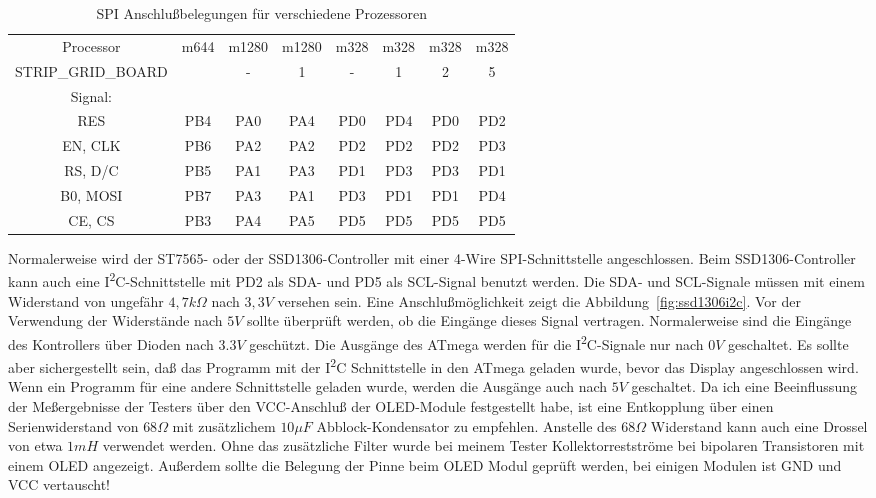 \begin{table}[H]
  \begin{center}
    \begin{tabular}{| c || c | c | c | c | c | c | c |}
    \hline
 Processor  & m644  & m1280 & m1280  & m328 & m328 & m328 & m328 \\
STRIP\_GRID\_BOARD &       &   -   &   1    &  -   &  1   &  2   &  5   \\
    \hline
    \hline
Signal:     &       &       &        &      &      &      &      \\
  RES       &  PB4  & PA0   &  PA4   & PD0  & PD4  & PD0  & PD2 \\
    \hline
  EN, CLK   &  PB6  & PA2   &  PA2   & PD2  & PD2  & PD2  & PD3 \\
    \hline
  RS, D/C   &  PB5  & PA1   &  PA3   & PD1  & PD3  & PD3  & PD1 \\
    \hline
  B0, MOSI  &  PB7  & PA3   &  PA1   & PD3  & PD1  & PD1  & PD4 \\
    \hline
  CE, CS    &  PB3  & PA4   &  PA5   & PD5  & PD5  & PD5  & PD5 \\
    \hline
    \end{tabular}
  \end{center}
  \caption{SPI Anschlußbelegungen für verschiedene Prozessoren}
\label{tab:spi-processor}
\end{table}

Normalerweise wird der ST7565- oder der SSD1306-Controller mit einer 4-Wire SPI-Schnittstelle angeschlossen.
Beim SSD1306-Controller kann auch eine I\textsuperscript{2}C-Schnittstelle mit PD2 als SDA- und PD5 als SCL-Signal benutzt werden.
Die SDA- und SCL-Signale müssen mit einem  Widerstand von ungefähr \(4,7k\Omega\) nach \(3,3V\) versehen sein.
Eine Anschlußmöglichkeit zeigt die Abbildung~\ref{fig:ssd1306i2c}.
Vor der Verwendung der  Widerstände nach \(5V\) sollte überprüft werden, ob die Eingänge dieses Signal vertragen.
Normalerweise sind die Eingänge des Kontrollers über Dioden nach \(3.3V\) geschützt.
Die Ausgänge des ATmega werden für die I\textsuperscript{2}C-Signale nur nach \(0V\) geschaltet.
Es sollte aber sichergestellt sein, daß das Programm mit der I\textsuperscript{2}C Schnittstelle in den ATmega geladen wurde,
bevor das Display angeschlossen wird. Wenn ein Programm für eine andere Schnittstelle geladen wurde,
werden die Ausgänge auch nach \(5V\) geschaltet.
Da ich eine Beeinflussung der Meßergebnisse der Testers über den VCC-Anschluß der OLED-Module festgestellt habe, 
ist eine Entkopplung über einen Serienwiderstand von \(68\Omega\) mit zusätzlichem \(10\mu F\)
 Abblock-Kondensator zu empfehlen. 
Anstelle des \(68\Omega\) Widerstand kann auch eine Drossel von etwa \(1mH\) verwendet werden.
Ohne das zusätzliche Filter wurde bei meinem Tester Kollektorrestströme bei bipolaren Transistoren mit einem OLED angezeigt.
Außerdem sollte die Belegung der Pinne beim OLED Modul geprüft werden, bei einigen Modulen ist GND und VCC vertauscht!
 
